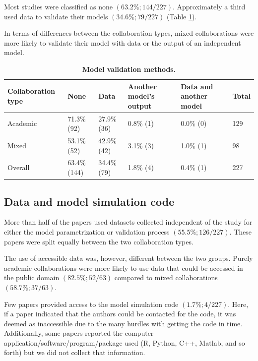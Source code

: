\documentclass[10pt,letterpaper]{article}
\begin{document}
Most studies were classified as none $(63.2\%; 144/227)$. Approximately a third used data to validate their models $(34.6\%; 79/227)$ (Table \ref{model_validation_results}). 


In terms of differences between the collaboration types, mixed collaborations were more likely to validate their model with data or the output of an independent model. 

\begin{table}[!h]
	\centering
	\setlength\arrayrulewidth{1pt} 
	\caption{\bf Model validation methods.}
	\begin{adjustwidth}{-0.00in}{0in}
		\begin{tabular}{| p{}  p{} p{} p{} p{} p{}|}
			\hline
			\textbf{Collaboration type} & \textbf{None} & \textbf{Data} & \textbf{Another model's output} & \textbf{Data and another model} & \textbf{Total} \\ \hline
			Academic & 71.3\% (92) & 27.9\% (36) & 0.8\% (1) & 0.0\% (0) & 129 \\ \hline
			Mixed & 53.1\% (52) & 42.9\% (42) & 3.1\% (3) & 1.0\% (1) & 98 \\ \hline \rowcolor{gray!20}
			Overall & 63.4\% (144) & 34.4\% (79) & 1.8\% (4) & 0.4\% (1) & 227\\ \hline
		\end{tabular}
	\end{adjustwidth}
	\label{model_validation_results}
\end{table}


\subsection*{Data and model simulation code}
More than half of the papers used datasets collected independent of the study for either the model parametrization or validation process $(55.5\%; 126/227)$. These papers were split equally between the two collaboration types. 

The use of accessible data was, however, different between the two groups. Purely academic collaborations were more likely to use data that could be accessed in the public domain $(82.5\%; 52/63)$ compared to mixed collaborations $(58.7\%; 37/63)$.  

Few papers provided access to the model simulation code $(1.7\%; 4/227)$. Here, if a paper indicated that the authors could be contacted for the code, it was deemed as inaccessible due to the many hurdles with getting the code in time. Additionally, some papers reported the computer application/software/program/package used (R, Python, C++, Matlab, and so forth) but we did not collect that information. 
\end{document}
